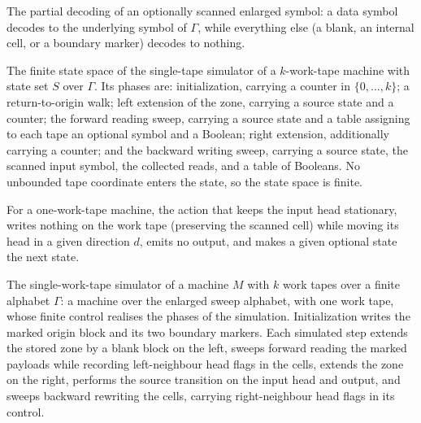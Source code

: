 \begin{definition}
\label{Turing.FinTM.sweepInput}
\leanok
{}
The partial decoding of an optionally scanned enlarged symbol: a data symbol decodes to
the underlying symbol of $\Gamma$, while everything else (a blank, an internal cell, or
a boundary marker) decodes to nothing.
\end{definition}

\begin{definition}
\label{Turing.FinTM.SweepState}
\leanok
The finite state space of the single-tape simulator of a $k$-work-tape machine with
state set $S$ over $\Gamma$. Its phases are: initialization, carrying a counter in
$\{0, \dots, k\}$; a return-to-origin walk; left extension of the zone, carrying a
source state and a counter; the forward reading sweep, carrying a source state and a
table assigning to each tape an optional symbol and a Boolean; right extension,
additionally carrying a counter; and the backward writing sweep, carrying a source
state, the scanned input symbol, the collected reads, and a table of Booleans. No
unbounded tape coordinate enters the state, so the state space is finite.
\end{definition}

\begin{definition}
\label{Turing.FinTM.sweepMove}
\leanok
{}
For a one-work-tape machine, the action that keeps the input head stationary, writes
nothing on the work tape (preserving the scanned cell) while moving its head in a given
direction $d$, emits no output, and makes a given optional state the next state.
\end{definition}

\begin{definition}
\label{Turing.FinTM.sweepTM}
\leanok
{}
The single-work-tape simulator of a machine $M$ with $k$ work tapes over a finite
alphabet $\Gamma$: a machine over the enlarged sweep alphabet, with one work tape, whose
finite control realises the phases of the simulation. Initialization writes the marked
origin block and its two boundary markers. Each simulated step extends the stored zone
by a blank block on the left, sweeps forward reading the marked payloads while recording
left-neighbour head flags in the cells, extends the zone on the right, performs the
source transition on the input head and output, and sweeps backward rewriting the cells,
carrying right-neighbour head flags in its control.
\end{definition}

